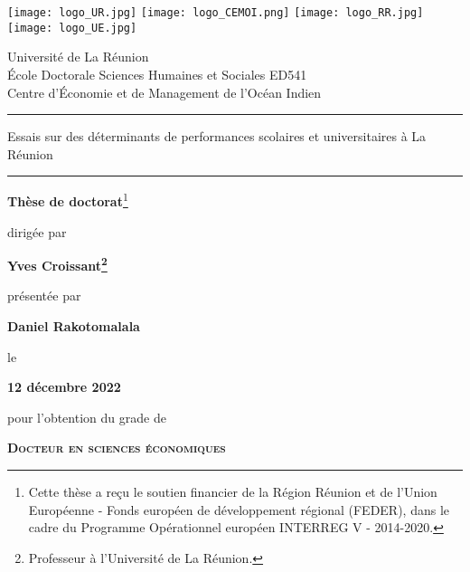 \documentclass[
]{book}
\author{}
\date{\vspace{-2.5em}}
\begin{document}
\newpage
\fontsize{12}{16}\selectfont
\pagestyle{plain}


\begin{titlepage}
\begin{center}

  \texttt{[image: logo\_UR.jpg]} \hfill 
  \texttt{[image: logo\_CEMOI.png]} \hfill
  \texttt{[image: logo\_RR.jpg]} \hfill
  \texttt{[image: logo\_UE.jpg]}

	\vfill

{
\small
Université de La Réunion \\
École Doctorale Sciences Humaines et Sociales ED541 \\
Centre d'Économie et de Management de l'Océan Indien
}


\vfill

 {
 \Large\bfseries 
 \rule{\linewidth}{1pt} 
 Essais sur des déterminants de performances scolaires et universitaires à La Réunion 
 \rule{\linewidth}{1pt}
 }
 
	\vfill
	
{
\renewcommand*{\thefootnote}{\fnsymbol{footnote}}
\textbf{Thèse de doctorat}\footnote[2]{
\small
Cette thèse a reçu le soutien financier de la Région Réunion et de l'Union Européenne - Fonds européen de développement régional (FEDER), dans le cadre du Programme Opérationnel européen INTERREG V - 2014-2020.
}
\renewcommand*{\thefootnote}{\arabic{footnote}}
} 

	\vfill

{dirigée par}

  \vfill

{
\renewcommand*{\thefootnote}{\fnsymbol{footnote}}
\textbf{Yves Croissant\footnote[1]{
\small 
Professeur à l'Université de La Réunion.
}}}

  \vfill

{présentée par}

	\vfill
	
{\textbf{Daniel Rakotomalala}}
	
	\vfill

{le}

  \vfill

{\textbf{12 décembre 2022}}	

  \vfill
	
{pour l'obtention du grade de} 

	\vfill
	
{\textsc{\textbf{{Docteur en sciences économiques}}}} 


\end{center}
\end{titlepage}
\end{document}
